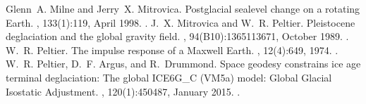 \documentclass[letterpaper,10pt,english]{sphinxmanual}
\begin{document}
\begin{sphinxthebibliography}{1}
\sphinxAtStartPar
Glenn A. Milne and Jerry X. Mitrovica. Postglacial sea\sphinxhyphen{}level change on a rotating Earth. , 133(1):1\textendash{}19, April 1998. .
\sphinxAtStartPar
J. X. Mitrovica and W. R. Peltier. Pleistocene deglaciation and the global gravity field. , 94(B10):13651\textendash{}13671, October 1989. .
\sphinxAtStartPar
W. R. Peltier. The impulse response of a Maxwell Earth. , 12(4):649, 1974. .
\sphinxAtStartPar
W. R. Peltier, D. F. Argus, and R. Drummond. Space geodesy constrains ice age terminal deglaciation: The global ICE\sphinxhyphen{}6G\_C (VM5a) model: Global Glacial Isostatic Adjustment. , 120(1):450\textendash{}487, January 2015. .
\end{sphinxthebibliography}



\renewcommand{\indexname}{Index}
\printindex
\end{document}
